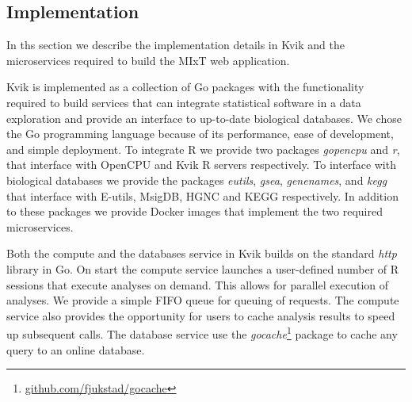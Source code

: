 

\subsection*{Implementation}
In ths section we describe the implementation details in Kvik and the
microservices required to build the MIxT web application. 

Kvik is implemented as a collection of Go packages with the
functionality required to build services that can integrate statistical
software in a data exploration and provide an interface to up-to-date biological
databases. We chose the Go programming language because of its performance, ease
of development, and simple deployment. 
To integrate R we provide two packages \emph{gopencpu} and
\emph{r}, that interface with OpenCPU and Kvik R servers respectively. To
interface with biological databases we provide the packages \emph{eutils},
\emph{gsea}, \emph{genenames}, and \emph{kegg} that interface with E-utils,
MsigDB, HGNC and KEGG respectively.
In addition to these packages we provide Docker images that implement the
two required microservices. 

Both the compute and the databases service in Kvik builds on the standard
\emph{http} library in Go. On start the compute service 
launches a user-defined number of R sessions that execute analyses on demand.
This allows for parallel execution of analyses. We provide a simple FIFO queue
for queuing of requests. The compute service also provides the opportunity for users to
cache analysis results to speed up subsequent calls. The database service use
the \emph{gocache}\footnote{\url{github.com/fjukstad/gocache}} package to cache
any query to an online database.

% 
% 
% 
% 
% 

